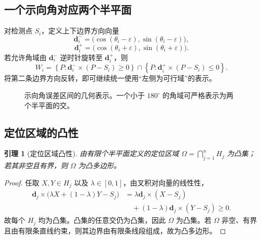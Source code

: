 \documentclass[UTF8,12pt,a4paper]{ctexart}
\newtheorem{lemma}[theorem]{引理}
\theoremstyle{definition}
\newcommand{\eps}{\varepsilon}
\newcommand{\cross}{\mathbin{\times}}
\begin{document}
\subsection{一个示向角对应两个半平面}

对检测点 $S_i$，定义上下边界方向向量
\begin{equation}
\bm d_i^-=
\bigl(\cos(\theta_i-\eps),\sin(\theta_i-\eps)\bigr),
\end{equation}
\begin{equation}
\bm d_i^+=
\bigl(\cos(\theta_i+\eps),\sin(\theta_i+\eps)\bigr).
\end{equation}
若允许角域由 $\bm d_i^-$ 逆时针旋转至 $\bm d_i^+$，则
\begin{equation}
W_i=
\left\{P:\bm d_i^-\cross(P-S_i)\geq0\right\}
\cap
\left\{P:\bm d_i^+\cross(P-S_i)\leq0\right\}.
\label{eq:wedge-two-hp}
\end{equation}
将第二条边界方向反转，即可继续统一使用“左侧为可行域”的表示。

\begin{figure}[htbp]
\centering
{}
\caption{示向角误差区间的几何表示。一个小于 $180^\circ$ 的角域可严格表示为两个半平面的交。}
\label{fig:wedge-halfplanes}
\end{figure}

\subsection{定位区域的凸性}

\begin{lemma}[定位区域凸性]
由有限个半平面定义的定位区域 $\Omega=\bigcap_{j=1}^nH_j$ 为凸集；若其非空且有界，则 $\Omega$ 为凸多边形。
\end{lemma}
\begin{proof}
任取 $X,Y\in H_j$ 以及 $\lambda\in[0,1]$，由叉积对向量的线性性，
\begin{align}
\bm d_j\cross\bigl(\lambda X+(1-\lambda)Y-S_j\bigr)
&=\lambda\bm d_j\cross(X-S_j)\\
&\quad +(1-\lambda)\bm d_j\cross(Y-S_j)\geq0.
\end{align}
故每个 $H_j$ 均为凸集。凸集的任意交仍为凸集，因此 $\Omega$ 为凸集。若 $\Omega$ 非空、有界且由有限条直线约束，则其边界由有限条线段组成，故为凸多边形。
\end{proof}
\end{document}
